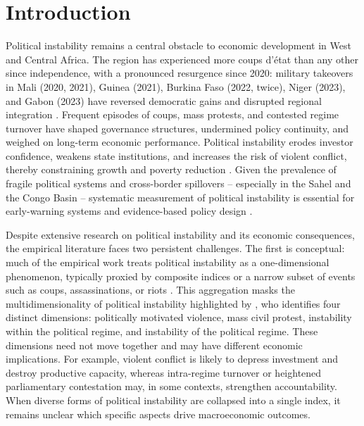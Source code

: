 \documentclass[12pt,a4paper,fleqn]{article}
\def\spacingset#1{\renewcommand{\baselinestretch}{#1}\small\normalsize}
\begin{document}
\newpage

\setcounter{page}{1}

\spacingset{1.84}



\section{Introduction}

Political instability remains a central obstacle to economic development in West and Central Africa. The region has experienced more coups d'état than any other since independence, with a pronounced resurgence since 2020: military takeovers in Mali (2020, 2021), Guinea (2021), Burkina Faso (2022, twice), Niger (2023), and Gabon (2023) have reversed democratic gains and disrupted regional integration \citep{mcgowan2003}. Frequent episodes of coups, mass protests, and contested regime turnover have shaped governance structures, undermined policy continuity, and weighed on long-term economic performance. Political instability erodes investor confidence, weakens state institutions, and increases the risk of violent conflict, thereby constraining growth and poverty reduction \citep{Alesina1996, VERDUGO2013, aisen2013, collier2002, CHEN1996, DARBY2004, DEVEREUX1998}. Given the prevalence of fragile political systems and cross-border spillovers -- especially in the Sahel and the Congo Basin -- systematic measurement of political instability is essential for early-warning systems and evidence-based policy design \citep{goldstone2010, hegre2017}.

Despite extensive research on political instability and its economic consequences, the empirical literature faces two persistent challenges. The first is conceptual: much of the empirical work treats political instability as a one-dimensional phenomenon, typically proxied by composite indices or a narrow subset of events such as coups, assassinations, or riots \citep{Feierabend1966, Rummel1966, Tanter1966, Alesina1996, Perotti1996}. This aggregation masks the multidimensionality of political instability highlighted by \cite{JONGAPIN2009}, who identifies four distinct dimensions: politically motivated violence, mass civil protest, instability within the political regime, and instability of the political regime. These dimensions need not move together and may have different economic implications. For example, violent conflict is likely to depress investment and destroy productive capacity, whereas intra-regime turnover or heightened parliamentary contestation may, in some contexts, strengthen accountability. When diverse forms of political instability are collapsed into a single index, it remains unclear which specific aspects drive macroeconomic %
outcomes.
\end{document}
